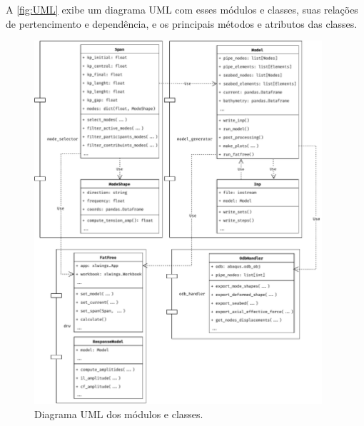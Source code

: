 A \autoref{fig:UML} exibe um diagrama UML com esses módulos e classes, suas relações de pertencimento e dependência, e os principais métodos e atributos das classes.

\begin{figure}[!ht]
    \centering
    \caption{Diagrama UML dos módulos e classes.}\label{fig:UML}
    \includegraphics[width=0.95\textwidth]{imagens/UML}
\end{figure}
